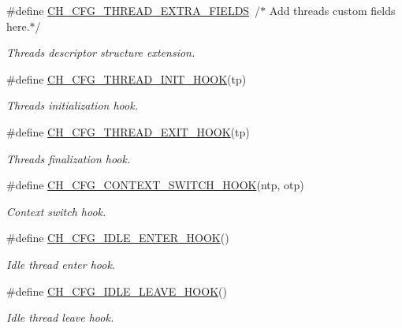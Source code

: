 \begin{DoxyCompactItemize}
\item 
\#define \hyperlink{group__config_ga376f299366010470175d4abbb0e8096b}{C\+H\+\_\+\+C\+F\+G\+\_\+\+T\+H\+R\+E\+A\+D\+\_\+\+E\+X\+T\+R\+A\+\_\+\+F\+I\+E\+L\+D\+S}~/$\ast$ Add threads custom fields here.$\ast$/
\begin{DoxyCompactList}\small\item\em Threads descriptor structure extension. \end{DoxyCompactList}\item 
\#define \hyperlink{group__config_gaf52424f7ed3a7c4e7e49b144997aed2c}{C\+H\+\_\+\+C\+F\+G\+\_\+\+T\+H\+R\+E\+A\+D\+\_\+\+I\+N\+I\+T\+\_\+\+H\+O\+O\+K}(tp)
\begin{DoxyCompactList}\small\item\em Threads initialization hook. \end{DoxyCompactList}\item 
\#define \hyperlink{group__config_ga6672f72a17e29db6ff3f951001c007bf}{C\+H\+\_\+\+C\+F\+G\+\_\+\+T\+H\+R\+E\+A\+D\+\_\+\+E\+X\+I\+T\+\_\+\+H\+O\+O\+K}(tp)
\begin{DoxyCompactList}\small\item\em Threads finalization hook. \end{DoxyCompactList}\item 
\#define \hyperlink{group__config_ga61b9805943d69980f6778106ad3fbb9c}{C\+H\+\_\+\+C\+F\+G\+\_\+\+C\+O\+N\+T\+E\+X\+T\+\_\+\+S\+W\+I\+T\+C\+H\+\_\+\+H\+O\+O\+K}(ntp, otp)
\begin{DoxyCompactList}\small\item\em Context switch hook. \end{DoxyCompactList}\item 
\#define \hyperlink{group__config_ga5193dc6602d532b5eb171c6459d80707}{C\+H\+\_\+\+C\+F\+G\+\_\+\+I\+D\+L\+E\+\_\+\+E\+N\+T\+E\+R\+\_\+\+H\+O\+O\+K}()
\begin{DoxyCompactList}\small\item\em Idle thread enter hook. \end{DoxyCompactList}\item 
\#define \hyperlink{group__config_ga2b4d6d05e655234eb7b46fb16e8180a9}{C\+H\+\_\+\+C\+F\+G\+\_\+\+I\+D\+L\+E\+\_\+\+L\+E\+A\+V\+E\+\_\+\+H\+O\+O\+K}()
\begin{DoxyCompactList}\small\item\em Idle thread leave hook. \end{DoxyCompactList}\item 

\end{DoxyCompactItemize}
